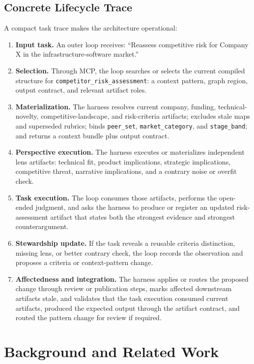 \documentclass{article}
\begin{document}
\subsection{Concrete Lifecycle Trace}

A compact task trace makes the architecture operational:
\begin{enumerate}[leftmargin=*]
\item \textbf{Input task.} An outer loop receives: ``Reassess competitive risk for Company X in the infrastructure-software market.''
\item \textbf{Selection.} Through MCP, the loop searches or selects the current compiled structure for \texttt{competitor\_risk\_assessment}: a context pattern, graph region, output contract, and relevant artifact roles.
\item \textbf{Materialization.} The harness resolves current company, funding, technical-novelty, competitive-landscape, and risk-criteria artifacts; excludes stale maps and superseded rubrics; binds \texttt{peer\_set}, \texttt{market\_category}, and \texttt{stage\_band}; and returns a context bundle plus output contract.
\item \textbf{Perspective execution.} The harness executes or materializes independent lens artifacts: technical fit, product implications, strategic implications, competitive threat, narrative implications, and a contrary noise or overfit check.
\item \textbf{Task execution.} The loop consumes those artifacts, performs the open-ended judgment, and asks the harness to produce or register an updated risk-assessment artifact that states both the strongest evidence and strongest counterargument.
\item \textbf{Stewardship update.} If the task reveals a reusable criteria distinction, missing lens, or better contrary check, the loop records the observation and proposes a criteria or context-pattern change.
\item \textbf{Affectedness and integration.} The harness applies or routes the proposed change through review or publication steps, marks affected downstream artifacts stale, and validates that the task execution consumed current artifacts, produced the expected output through the artifact contract, and routed the pattern change for review if required.
\end{enumerate}

\section{Background and Related Work}
\end{document}
